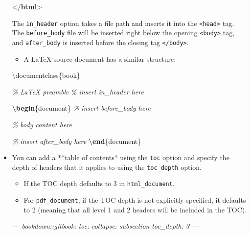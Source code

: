 \documentclass[
  a4paper,
  twoside,
  openright]{book}
\newenvironment{Shaded}{\begin{snugshade}}{\end{snugshade}}
\newcommand{\BuiltInTok}[1]{#1}
\newcommand{\CommentTok}[1]{\textcolor[rgb]{0.56,0.35,0.01}{\textit{#1}}}
\newcommand{\DataTypeTok}[1]{\textcolor[rgb]{0.13,0.29,0.53}{#1}}
\newcommand{\ExtensionTok}[1]{#1}
\newcommand{\KeywordTok}[1]{\textcolor[rgb]{0.13,0.29,0.53}{\textbf{#1}}}
\newcommand{\NormalTok}[1]{#1}
\providecommand{\tightlist}{%
  \setlength{\itemsep}{0pt}\setlength{\parskip}{0pt}}
\theoremstyle{definition}
\theoremstyle{definition}
\theoremstyle{definition}
\theoremstyle{definition}
\theoremstyle{remark}
\begin{document}
\begin{itemize}
\begin{Shaded}
\begin{Highlighting}[]
\DataTypeTok{\textless{}/}\KeywordTok{html}\DataTypeTok{\textgreater{}}
\end{Highlighting}
\end{Shaded}

  The \texttt{in\_header} option takes a file path and inserts it into the \texttt{\textless{}head\textgreater{}} tag. The \texttt{before\_body} file will be inserted right below the opening \texttt{\textless{}body\textgreater{}} tag, and \texttt{after\_body} is inserted before the closing tag \texttt{\textless{}/body\textgreater{}}.

  \begin{itemize}
  \tightlist
  \item
    A LaTeX source document has a similar structure:
  \end{itemize}

\begin{Shaded}
\begin{Highlighting}[]
\BuiltInTok{\textbackslash{}documentclass}\NormalTok{\{}\ExtensionTok{book}\NormalTok{\}}

\CommentTok{\% LaTeX preamble}
\CommentTok{\% insert in\_header here}

\KeywordTok{\textbackslash{}begin}\NormalTok{\{}\ExtensionTok{document}\NormalTok{\}}
\CommentTok{\% insert before\_body here}

\CommentTok{\% body content here}

\CommentTok{\% insert after\_body here}
\KeywordTok{\textbackslash{}end}\NormalTok{\{}\ExtensionTok{document}\NormalTok{\}}
\end{Highlighting}
\end{Shaded}
\item
  You can add a **table of contents* using the \texttt{toc} option and specify the depth of headers that it applies to using the \texttt{toc\_depth} option.

  \begin{itemize}
  \tightlist
  \item
    If the TOC depth defaults to 3 in \texttt{html\_document}.
  \item
    For \texttt{pdf\_document}, if the TOC depth is not explicitly specified, it defaults to 2 (meaning that all level 1 and 2 headers will be included in the TOC).
  \end{itemize}

\begin{Shaded}
\begin{Highlighting}[]
\CommentTok{{-}{-}{-}}
\CommentTok{bookdown::gitbook:}
\CommentTok{    toc:}
\CommentTok{        collapse: subsection}
\CommentTok{    toc\_depth: 3}
\CommentTok{{-}{-}{-}}
\end{Highlighting}
\end{Shaded}


\end{itemize}
\end{document}
